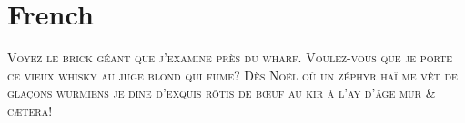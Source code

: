 
\presection\section*{\checkyes French}\postsection

\noindent\textsc{Voyez le brick géant que j’examine près du wharf.
Voulez-vous que je porte ce vieux whisky au juge blond qui fume\medspace?
Dès Noël où un zéphyr haï me vêt de glaçons würmiens 
je dîne d’exquis rôtis de bœuf au kir à l’aÿ d’âge mûr \& cætera\medspace!}